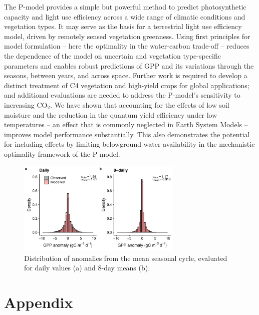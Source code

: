 \documentclass{myreport}
\newcommand{\coo}{CO$_2$}
\begin{document}
The P-model provides a simple but powerful method to predict photosynthetic capacity and light use efficiency across a wide range of climatic conditions and vegetation types. It may serve as the basis for a terrestrial light use efficiency model, driven by remotely sensed vegetation greenness. Using first principles for model formulation -- here the optimality in the water-carbon trade-off -- reduces the dependence of the model on uncertain and vegetation type-specific parameters and enables robust predictions of GPP and its variations through the seasons, between years, and across space. Further work is required to develop a distinct treatment of C4 vegetation and high-yield crops for global applications; and additional evaluations are needed to address the P-model's sensitivity to increasing \coo . We have shown that accounting for the effects of low soil moisture and the reduction in the quantum yield efficiency under low temperatures -- an effect that is commonly neglected in Earth System Models -- improves model performance substantially. This also demonstrates the potential for including effects by limiting belowground water availability in the mechanistic optimality framework of the P-model. 

\begin{figure}[!ht]
    \centering
\includegraphics[width=0.7\textwidth]{fig/hist_anomalies.pdf}
    \caption{Distribution of anomalies from the mean seasonal cycle, evaluated for daily values (a) and 8-day means (b).} 
    \label{fig:modobs_anomalies}
\end{figure}

\clearpage


\section{Appendix}
\end{document}
